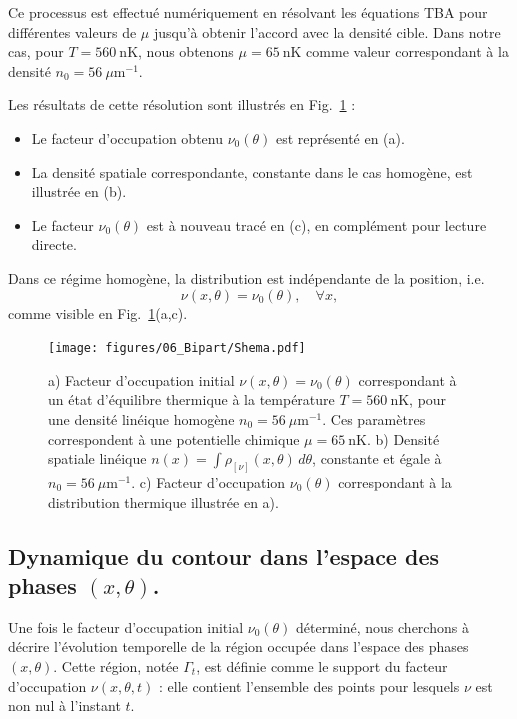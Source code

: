 Ce processus est effectué numériquement en résolvant les équations TBA pour différentes valeurs de $\mu$ jusqu’à obtenir l’accord avec la densité cible. Dans notre cas, pour $T = 560~\mathrm{nK}$, nous obtenons $\mu = 65~\mathrm{nK}$ comme valeur correspondant à la densité $n_0 = 56~\mu\mathrm{m}^{-1}$.

Les résultats de cette résolution sont illustrés en Fig.~\ref{fig:BiPart.insitut} :
\begin{itemize}[label = $\bullet$]
    \item Le facteur d’occupation obtenu $\nu_0(\theta)$ est représenté en (a).
    \item La densité spatiale correspondante, constante dans le cas homogène, est illustrée en (b).
    \item Le facteur $\nu_0(\theta)$ est à nouveau tracé en (c), en complément pour lecture directe.
\end{itemize}

Dans ce régime homogène, la distribution est indépendante de la position, i.e.
\begin{equation}
\nu(x, \theta) = \nu_0(\theta), \quad \forall x,
\end{equation}
comme visible en Fig.~\ref{fig:BiPart.insitut}(a,c).


\begin{figure}[!htb]
	\centering
	\texttt{[image: figures/06\_Bipart/Shema.pdf]}	
	\caption{a) Facteur d’occupation initial $\nu(x, \theta) = \nu_0(\theta)$ correspondant à un état d’équilibre thermique à la température $T = 560~\mathrm{nK}$, pour une densité linéique homogène $n_0 = 56~\mu\mathrm{m}^{-1}$. Ces paramètres correspondent à une potentielle chimique $\mu = 65~\mathrm{nK}$.
b) Densité spatiale linéique $n(x) = \int \rho_{[\nu]}(x, \theta)\, d\theta$, constante et égale à $n_0 = 56~\mu\mathrm{m}^{-1}$.
c) Facteur d’occupation $\nu_0(\theta)$ correspondant à la distribution thermique illustrée en a).}
	\label{fig:BiPart.insitut}
\end{figure}


\subsection{Dynamique du contour dans l’espace des phases $(x, \theta)$.}
\label{sec:contour_GHD}

Une fois le facteur d’occupation initial $\nu_0(\theta)$ déterminé, nous cherchons à décrire l’évolution temporelle de la région occupée dans l’espace des phases $(x,\theta)$. Cette région, notée $\Gamma_t$, est définie comme le support du facteur d’occupation $\nu(x,\theta,t)$ : elle contient l’ensemble des points pour lesquels $\nu$ est non nul à l’instant $t$.

